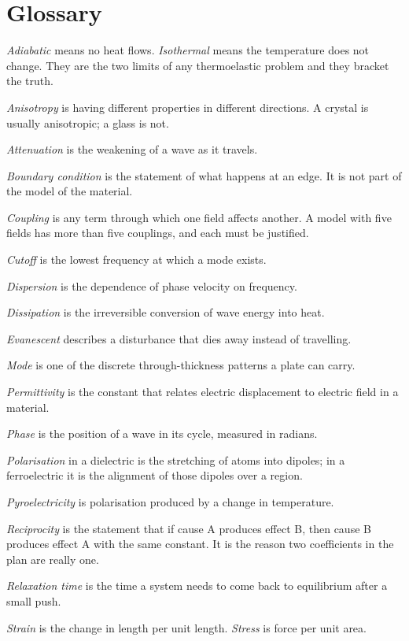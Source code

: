 \documentclass[11pt]{article}
\begin{document}
\section{Glossary}

\textit{Adiabatic} means no heat flows. \textit{Isothermal} means the temperature does not change. They are
the two limits of any thermoelastic problem and they bracket the truth.

\textit{Anisotropy} is having different properties in different directions. A crystal is usually anisotropic;
a glass is not.

\textit{Attenuation} is the weakening of a wave as it travels.

\textit{Boundary condition} is the statement of what happens at an edge. It is not part of the model of the
material.

\textit{Coupling} is any term through which one field affects another. A model with five fields has more than
five couplings, and each must be justified.

\textit{Cutoff} is the lowest frequency at which a mode exists.

\textit{Dispersion} is the dependence of phase velocity on frequency.

\textit{Dissipation} is the irreversible conversion of wave energy into heat.

\textit{Evanescent} describes a disturbance that dies away instead of travelling.

\textit{Mode} is one of the discrete through-thickness patterns a plate can carry.

\textit{Permittivity} is the constant that relates electric displacement to electric field in a material.

\textit{Phase} is the position of a wave in its cycle, measured in radians.

\textit{Polarisation} in a dielectric is the stretching of atoms into dipoles; in a ferroelectric it is the
alignment of those dipoles over a region.

\textit{Pyroelectricity} is polarisation produced by a change in temperature.

\textit{Reciprocity} is the statement that if cause A produces effect B, then cause B produces effect A with
the same constant. It is the reason two coefficients in the plan are really one.

\textit{Relaxation time} is the time a system needs to come back to equilibrium after a small push.

\textit{Strain} is the change in length per unit length. \textit{Stress} is force per unit area.
\end{document}
